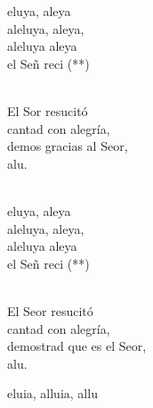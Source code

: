 \documentclass[12pt]{article}
\begin{document}
\begin{multicols*}{2}
        \begin{cancion}%
            \begin{chorus}%
            eluya, aleya\\
            aleluya, aleya,\\
            aleluya aleya\\
            el Señ reci (**)  \\
            \end{chorus}%
            \jump\\
            El Sor resucitó \\
        cantad con alegría,\\
            demos gracias al Seor,\\
            alu.\\\jump\\
            \begin{chorus}%
            eluya, aleya\\
            aleluya, aleya,\\
            aleluya aleya\\
            el Señ reci (**)  \\
            \end{chorus}%
            \jump\\
            El Seor resucitó\\
        cantad con alegría,\\
            demostrad que es el Seor,\\
            alu.\\
        \end{cancion}%
        
        \begin{cancion}[Alleluia 7][Taizé]%
            eluia, alluia, allu  \\
        \end{cancion}%
        

\end{multicols*}
\end{document}

